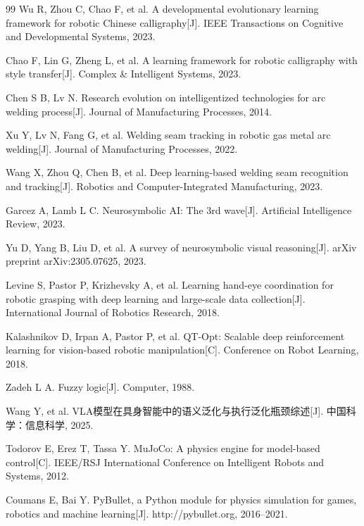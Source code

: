 \begin{thebibliography}{99}
Wu R, Zhou C, Chao F, et al.
A developmental evolutionary learning framework for robotic Chinese calligraphy[J].
IEEE Transactions on Cognitive and Developmental Systems, 2023.

Chao F, Lin G, Zheng L, et al.
A learning framework for robotic calligraphy with style transfer[J].
Complex \& Intelligent Systems, 2023.

Chen S B, Lv N.
Research evolution on intelligentized technologies for arc welding process[J].
Journal of Manufacturing Processes, 2014.

Xu Y, Lv N, Fang G, et al.
Welding seam tracking in robotic gas metal arc welding[J].
Journal of Manufacturing Processes, 2022.

Wang X, Zhou Q, Chen B, et al.
Deep learning-based welding seam recognition and tracking[J].
Robotics and Computer-Integrated Manufacturing, 2023.

Garcez A, Lamb L C.
Neurosymbolic AI: The 3rd wave[J].
Artificial Intelligence Review, 2023.

Yu D, Yang B, Liu D, et al.
A survey of neurosymbolic visual reasoning[J].
arXiv preprint arXiv:2305.07625, 2023.

Levine S, Pastor P, Krizhevsky A, et al.
Learning hand-eye coordination for robotic grasping with deep learning and large-scale data collection[J].
International Journal of Robotics Research, 2018.

Kalashnikov D, Irpan A, Pastor P, et al.
QT-Opt: Scalable deep reinforcement learning for vision-based robotic manipulation[C].
Conference on Robot Learning, 2018.

Zadeh L A.
Fuzzy logic[J].
Computer, 1988.

Wang Y, et al.
VLA模型在具身智能中的语义泛化与执行泛化瓶颈综述[J].
中国科学：信息科学, 2025.

Todorov E, Erez T, Tassa Y.
MuJoCo: A physics engine for model-based control[C].
IEEE/RSJ International Conference on Intelligent Robots and Systems, 2012.

Coumans E, Bai Y.
PyBullet, a Python module for physics simulation for games, robotics and machine learning[J].
http://pybullet.org, 2016--2021.

\end{thebibliography}
